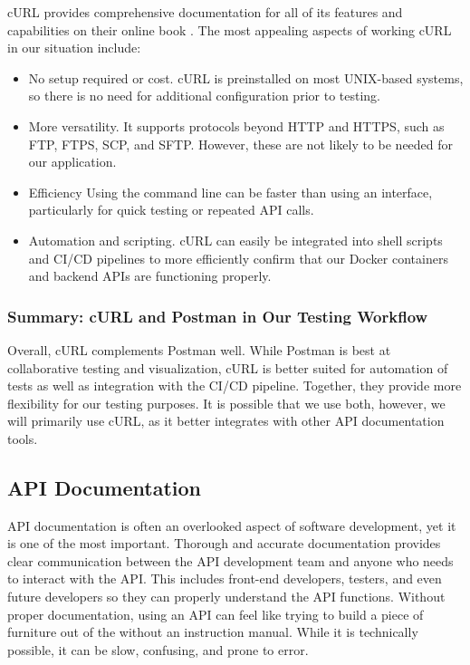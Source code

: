 \documentclass[12pt,titlepage]{article}
\begin{document}
cURL provides comprehensive documentation for all of its features and capabilities on their online book \cite{everything-curl}. The most appealing aspects of working cURL in our situation include:
\begin{itemize}
    \item No setup required or cost. cURL is preinstalled on most UNIX-based systems, so there is no need for additional configuration prior to testing.
    \item More versatility. It supports protocols beyond HTTP and HTTPS, such as FTP, FTPS, SCP, and SFTP. However, these are not likely to be needed for our application.
    \item Efficiency Using the command line can be faster than using an interface, particularly for quick testing or repeated API calls.
    \item Automation and scripting. cURL can easily be integrated into shell scripts and CI/CD pipelines to more efficiently confirm that our Docker containers and backend APIs are functioning properly.
\end{itemize}

\subsubsection{Summary: cURL and Postman in Our Testing Workflow}
Overall, cURL complements Postman well. While Postman is best at collaborative testing and visualization, cURL is better suited for automation of tests as well as integration with the CI/CD pipeline. Together, they provide more flexibility for our testing purposes. It is possible that we use both, however, we will primarily use cURL, as it better integrates with other API documentation tools.

\subsection{API Documentation}
API documentation is often an overlooked aspect of software development, yet it is one of the most important. Thorough and accurate documentation provides clear communication between the API development team and anyone who needs to interact with the API. This includes front-end developers, testers, and even future developers so they can properly understand the API functions. Without proper documentation, using an API can feel like trying to build a piece of furniture out of the without an instruction manual. While it is technically possible, it can be slow, confusing, and prone to error.
\end{document}
